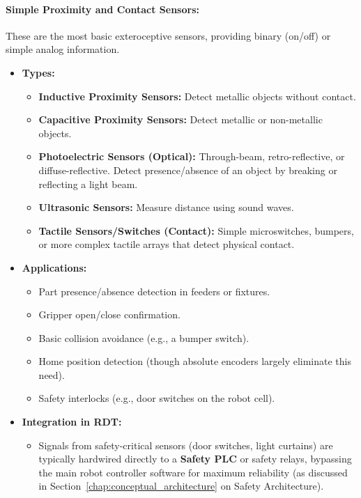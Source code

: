     \paragraph{ \textbf{Simple Proximity and Contact Sensors:}}
    These are the most basic exteroceptive sensors, providing binary (on/off) or simple analog information.
    \begin{itemize}
        \item \textbf{Types:}
            \begin{itemize}
                \item \textbf{Inductive Proximity Sensors:} Detect metallic objects without contact.
                \item \textbf{Capacitive Proximity Sensors:} Detect metallic or non-metallic objects.
                \item \textbf{Photoelectric Sensors (Optical):} Through-beam, retro-reflective, or diffuse-reflective. Detect presence/absence of an object by breaking or reflecting a light beam.
                \item \textbf{Ultrasonic Sensors:} Measure distance using sound waves.
                \item \textbf{Tactile Sensors/Switches (Contact):} Simple microswitches, bumpers, or more complex tactile arrays that detect physical contact.
            \end{itemize}
        \item \textbf{Applications:}
            \begin{itemize}
                \item Part presence/absence detection in feeders or fixtures.
                \item Gripper open/close confirmation.
                \item Basic collision avoidance (e.g., a bumper switch).
                \item Home position detection (though absolute encoders largely eliminate this need).
                \item Safety interlocks (e.g., door switches on the robot cell).
            \end{itemize}
        \item \textbf{Integration in RDT:}
            \begin{itemize}
                \item Signals from safety-critical sensors (door switches, light curtains) are typically hardwired directly to a \textbf{Safety PLC} or safety relays, bypassing the main robot controller software for maximum reliability (as discussed in Section~\ref{chap:conceptual_architecture} on Safety Architecture).

\end{itemize}
\end{itemize}

